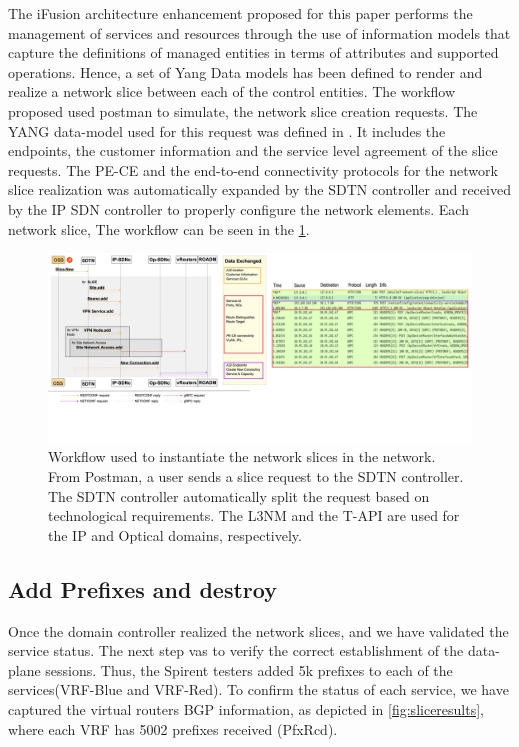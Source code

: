 \documentclass[journal,article,submit,moreauthors,pdftex]{Definitions/mdpi}
\begin{document}
The iFusion architecture enhancement proposed for this paper performs the management of services and resources through the use of information models that capture the definitions of managed entities in terms of attributes and supported operations. Hence, a set of Yang Data models has been defined to render and realize a network slice between each of the control entities. The workflow proposed used postman to simulate, the network slice creation requests. The YANG data-model used for this request was defined in \cite{liu2020slice}. It includes the endpoints, the customer information and the service level agreement of the slice requests. The PE-CE and the end-to-end connectivity protocols for the network slice realization was automatically expanded by the SDTN controller and received by the IP SDN controller to properly configure the network elements.  Each network slice, The workflow can be seen in the \cref{fig:slicecreation}.

\begin{figure}[htb]
\includegraphics[width=\linewidth]{Figs/slicecreation.png}
\caption{Workflow used to instantiate the network slices in the network. From Postman, a user sends a slice request to the SDTN controller. The SDTN controller automatically split the request based on technological requirements. The L3NM and the T-API are used for the IP and Optical domains, respectively.}
\label{fig:slicecreation}
\end{figure}


\subsection{Add Prefixes and destroy}

Once the domain controller realized the network slices, and we have validated the service status. The next step vas to verify the correct establishment of the data-plane sessions. Thus, the Spirent testers added 5k prefixes to each of the services(VRF-Blue and VRF-Red). To confirm the status of each service, we have captured the virtual routers BGP information, as depicted in \cref{fig:sliceresults}, where each VRF has 5002 prefixes received (PfxRcd). 
\end{document}
